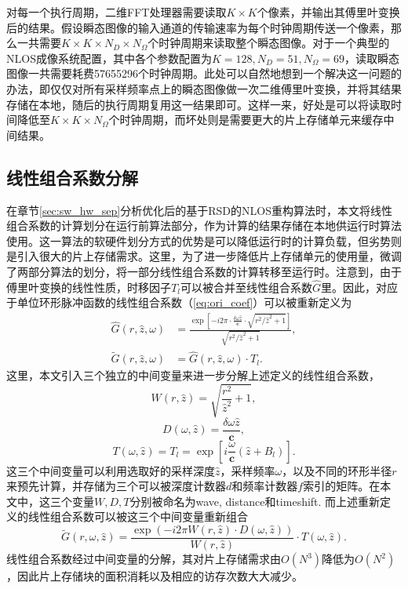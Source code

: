 \documentclass[master]{shtthesis}             %
\begin{document}
对每一个执行周期，二维FFT处理器需要读取$K\times K$个像素，并输出其傅里叶变换后的结果。假设瞬态图像的输入通道的传输速率为每个时钟周期传送一个像素，那么一共需要$K\times K\times N_D\times N_\Omega$个时钟周期来读取整个瞬态图像。对于一个典型的NLOS成像系统配置\citep{Liu2020}，其中各个参数配置为$K=128, N_D=51, N_\Omega=69$，读取瞬态图像一共需要耗费57655296个时钟周期。此处可以自然地想到一个解决这一问题的办法，即仅仅对所有采样频率点上的瞬态图像做一次二维傅里叶变换，并将其结果存储在本地，随后的执行周期复用这一结果即可。这样一来，好处是可以将读取时间降低至$K\times K\times N_\Omega$个时钟周期，而坏处则是需要更大的片上存储单元来缓存中间结果。

\subsection{线性组合系数分解}\label{sec:coef_decomp}

在章节\ref{sec:sw_hw_sep}分析优化后的基于RSD的NLOS重构算法时，本文将线性组合系数的计算划分在运行前算法部分，作为计算的结果存储在本地供运行时算法使用。这一算法的软硬件划分方式的优势是可以降低运行时的计算负载，但劣势则是引入很大的片上存储需求。这里，为了进一步降低片上存储单元的使用量，微调了两部分算法的划分，将一部分线性组合系数的计算转移至运行时。注意到，由于傅里叶变换的线性性质，时移因子$T_l$可以被合并至线性组合系数$\hat{G}$里。因此，对应于单位环形脉冲函数的线性组合系数（\ref{eq:ori_coef}）可以被重新定义为
\begin{align} \label{eq:coef}
    \hat{G}(r, \hat{z}, \omega) & = \frac{\exp{\left[-i2\pi\cdot\frac{\delta \omega\hat{z}}{\mathbf{c}}\cdot\sqrt{r^2/\hat{z}^2+1}\right]}}{\sqrt{r^2/\hat{z}^2+1}},\\
    \tilde{G}(r, \hat{z}, \omega) & = \hat{G}(r, \hat{z}, \omega) \cdot T_l .
\end{align}
这里，本文引入三个独立的中间变量来进一步分解上述定义的线性组合系数，
\begin{equation}
    W(r, \hat{z}) = \sqrt{\frac{r^2}{\hat{z}^2}+1},
\end{equation}
\begin{equation}
    D(\omega, \hat{z}) = \frac{\delta \omega \hat{z}}{\mathbf{c}},
\end{equation}
\begin{equation}
    T(\omega, \hat{z}) = T_l= \exp \left[ i\frac{\omega}{\mathbf{c}}(\hat{z}+B_l) \right].
\end{equation}
这三个中间变量可以利用选取好的采样深度$\hat{z}$，采样频率$\omega$，以及不同的环形半径$r$来预先计算，并存储为三个可以被深度计数器$d$和频率计数器$f$索引的矩阵。在本文中，这三个变量$W,D,T$分别被命名为wave, distance和timeshift. 而上述重新定义的线性组合系数可以被这三个中间变量重新组合
\begin{equation}
    \tilde{G}(r, \omega, \hat{z}) = \frac{\exp(-i2\pi W(r, \hat{z}) \cdot D(\omega, \hat{z}))}{W(r, \hat{z})} \cdot T(\omega, \hat{z}).
\end{equation}
线性组合系数经过中间变量的分解，其对片上存储需求由$O(N^3)$降低为$O(N^2)$，因此片上存储块的面积消耗以及相应的访存次数大大减少。
\end{document}
